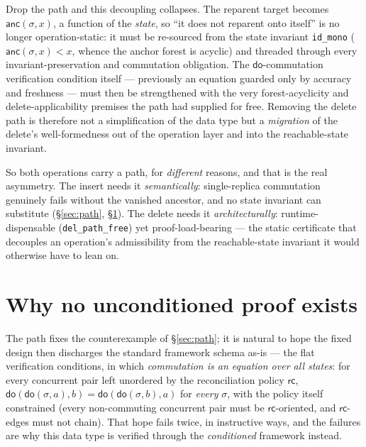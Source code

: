 \documentclass[11pt]{article}
\newcommand{\anc}{\mathsf{anc}}
\newcommand{\rc}{\mathsf{rc}}
\newcommand{\doo}{\mathsf{do}}
\begin{document}
Drop the path and this decoupling collapses. The reparent target becomes
$\anc(\sigma,x)$, a function of the \emph{state}, so ``it does not reparent onto
itself'' is no longer operation-static: it must be re-sourced from the state
invariant \texttt{id\_mono} ($\anc(\sigma,x)<x$, whence the anchor forest is acyclic)
and threaded through every invariant-preservation and commutation obligation. The
$\doo$-commutation verification condition itself --- previously an equation guarded
only by accuracy and freshness --- must then be strengthened with the very
forest-acyclicity and delete-applicability premises the path had supplied for free.
Removing the delete path is therefore not a simplification of the data type but a
\emph{migration} of the delete's well-formedness out of the operation layer and into
the reachable-state invariant.

So both operations carry a path, for \emph{different} reasons, and that is the real
asymmetry. The insert needs it \emph{semantically}: single-replica commutation
genuinely fails without the vanished ancestor, and no state invariant can substitute
(\S\ref{sec:path}, \S\ref{sec:uncond}). The delete needs it \emph{architecturally}:
runtime-dispensable (\texttt{del\_path\_free}) yet proof-load-bearing --- the static
certificate that decouples an operation's admissibility from the reachable-state
invariant it would otherwise have to lean on.

\section{Why no unconditioned proof exists}
\label{sec:uncond}

The path fixes the counterexample of \S\ref{sec:path}; it is natural to hope the
fixed design then discharges the standard framework schema as-is --- the flat
verification conditions, in which \emph{commutation is an equation over all
states}: for every concurrent pair left unordered by the reconciliation policy
$\rc$, $\doo(\doo(\sigma,a),b) = \doo(\doo(\sigma,b),a)$ for \emph{every}
$\sigma$, with the policy itself constrained (every non-commuting concurrent
pair must be $\rc$-oriented, and $\rc$-edges must not chain). That hope fails
twice, in instructive ways, and the failures are why this data type is verified
through the \emph{conditioned} framework instead.
\end{document}
